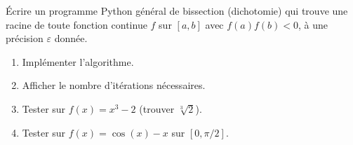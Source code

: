 \begin{bilan}
\begin{challenge}
\'Ecrire un programme Python g\'en\'eral de bissection (dichotomie)
qui trouve une racine de toute fonction continue $f$ sur $[a,b]$
avec $f(a)f(b)<0$, \`a une pr\'ecision $\varepsilon$ donn\'ee.
\begin{enumerate}
  \item Impl\'ementer l'algorithme.
  \item Afficher le nombre d'it\'erations n\'ecessaires.
  \item Tester sur $f(x)=x^3-2$ (trouver $\sqrt[3]{2}$).
  \item Tester sur $f(x)=\cos(x)-x$ sur $[0,\pi/2]$.
\end{enumerate}
\end{challenge}

\end{bilan}

